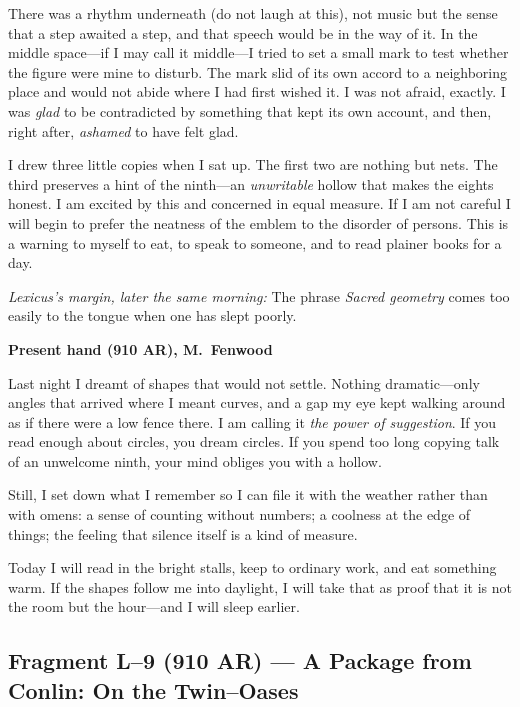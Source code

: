 \documentclass[11pt]{article}
\begin{document}
There was a rhythm underneath (do not laugh at this), not music but the sense that a step awaited a step, and that speech would be in the way of it. In the middle space—if I may call it middle—I tried to set a small mark to test whether the figure were mine to disturb. The mark slid of its own accord to a neighboring place and would not abide where I had first wished it. I was not afraid, exactly. I was \emph{glad} to be contradicted by something that kept its own account, and then, right after, \emph{ashamed} to have felt glad.

I drew three little copies when I sat up. The first two are nothing but nets. The third preserves a hint of the ninth—an \emph{unwritable} hollow that makes the eights honest. I am excited by this and concerned in equal measure. If I am not careful I will begin to prefer the neatness of the emblem to the disorder of persons. This is a warning to myself to eat, to speak to someone, and to read plainer books for a day.

\medskip
\noindent\textit{Lexicus’s margin, later the same morning:} The phrase \emph{Sacred geometry} comes too easily to the tongue when one has slept poorly.

\medskip
\noindent\textbf{Present hand (910 AR), M.\ Fenwood}

Last night I dreamt of shapes that would not settle. Nothing dramatic—only angles that arrived where I meant curves, and a gap my eye kept walking around as if there were a low fence there. I am calling it \emph{the power of suggestion}. If you read enough about circles, you dream circles. If you spend too long copying talk of an unwelcome ninth, your mind obliges you with a hollow.

Still, I set down what I remember so I can file it with the weather rather than with omens: a sense of counting without numbers; a coolness at the edge of things; the feeling that silence itself is a kind of measure.

Today I will read in the bright stalls, keep to ordinary work, and eat something warm. If the shapes follow me into daylight, I will take that as proof that it is not the room but the hour—and I will sleep earlier.

\subsection{Fragment L--9 (910 AR) --- A Package from Conlin: On the Twin--Oases}
\label{frag:l9}
{}
\end{document}
